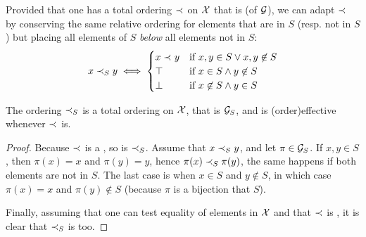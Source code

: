 \AP
Provided that one has a total ordering $\prec_{}$ on $\mathcal{X}$ that is 
 (of $\mathcal{G}$), we can adapt $\prec_{}$
by conserving the same relative ordering for elements that are in $S$
(resp. not in $S$) but placing all elements of $S$ \emph{below} all
elements not in $S$:
\begin{equation}
    x \sOrderLt y \iff 
    \begin{cases}
        x \order y & \text{if } x,y \in S \lor x,y \not\in S  \\
        \top       & \text{if } x \in S \land y \not \in S \\
        \bot       & \text{if } x \not\in S \land y \in S \\
    \end{cases}
\end{equation}

\begin{lemma}
    \label{lem:total-ordering}
    The ordering $\sOrderLt$ is a total ordering on $\mathcal{X}$,
    that is  $\mathcal{G}_S$,
    and is \kl(order){effective} whenever $\prec_{}$ is.
\end{lemma}
\begin{proof}
    Because $\prec_{}$ is a , 
    so is $\sOrderLt$. 
    Assume that $x \sOrderLt y$, and let $\pi \in \mathcal{G}_S$.
    If $x,y \in S$, then $\pi(x) = x$ and $\pi(y) = y$, hence
    $\pi(x) \sOrderLt \pi(y)$, the same happens if
    both elements are not in $S$. The last case is when
    $x \in S$ and $y \not \in S$, in which case $\pi(x) = x$
    and $\pi(y) \not \in S$ (because $\pi$ is a bijection that  $S$).

    Finally,
    assuming that one can test equality of elements in $\mathcal{X}$ and that
    $\prec_{}$ is , it is clear that $\sOrderLt$ is 
    too.
\end{proof}

